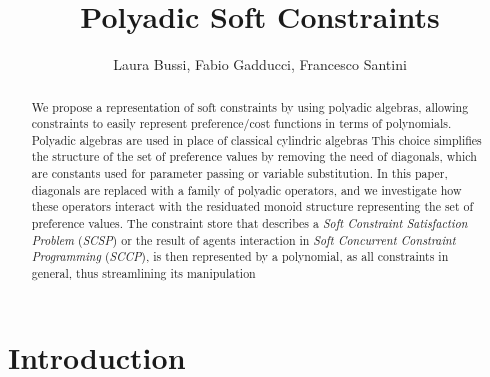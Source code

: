 \documentclass{llncs}
\newcommand\fnsep{\textsuperscript{,}}
\begin{document}
\title{Polyadic Soft Constraints}


\author{Laura Bussi, Fabio Gadducci, Francesco Santini%
} 
	

\maketitle

\begin{abstract}
We propose a representation of soft constraints by using polyadic algebras, allowing constraints to easily represent preference/cost functions in terms of polynomials. 
%
Polyadic algebras are used in place of classical cylindric algebras
%
This choice simplifies the structure of the set of preference values by removing the need of diagonals, which are constants used for parameter passing or variable substitution. 
%
In this paper, diagonals are replaced with a family of polyadic operators, and we investigate how these operators interact with the residuated monoid structure representing the set of preference values. 
%
The constraint store that describes a \emph{Soft Constraint Satisfaction Problem} (\emph{SCSP}) or the result of agents interaction in \emph{Soft Concurrent Constraint Programming} (\emph{SCCP}), 
is then represented by a polynomial, as all constraints in general, thus streamlining its manipulation
\end{abstract}


\section{Introduction}\label{sec:intro}
\end{document}
